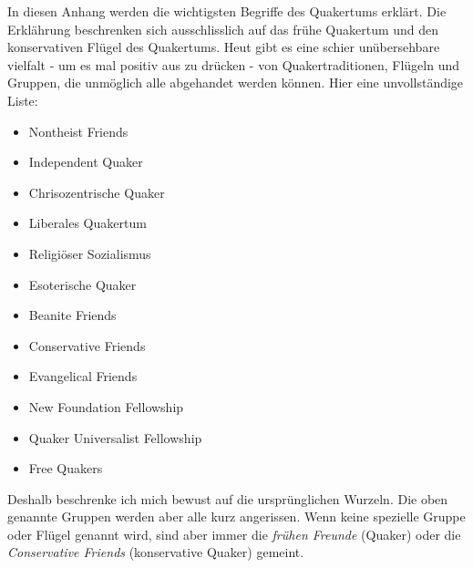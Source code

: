 
In diesen Anhang werden die wichtigsten Begriffe des Quakertums erklärt. Die Erklährung beschrenken sich ausschlisslich auf das frühe Quakertum und den konservativen Flügel des Quakertums. Heut gibt es eine schier unübersehbare vielfalt - um es mal positiv aus zu drücken - von Quakertraditionen, Flügeln und Gruppen, die unmöglich alle abgehandet werden können. Hier eine unvollständige Liste:

\begin{itemize}
\item Nontheist Friends
\item Independent Quaker
\item Chrisozentrische Quaker
\item Liberales Quakertum
\item Religiöser Sozialismus
\item Esoterische Quaker
\item Beanite Friends
\item Conservative Friends
\item Evangelical Friends 
\item New Foundation Fellowship
\item Quaker Universalist Fellowship
\item Free Quakers
\end{itemize}

Deshalb beschrenke ich mich bewust auf die ursprünglichen Wurzeln. Die oben genannte Gruppen werden aber alle kurz angerissen. Wenn keine spezielle Gruppe oder Flügel genannt wird, sind aber immer die \textit{frühen Freunde} (Quaker) oder die \textit{Conservative Friends} (konservative Quaker) gemeint.


\newcommand{\articlesize}{\footnotesize}

\twocolumn





























\onecolumn

\theendnotes


\null\newpage